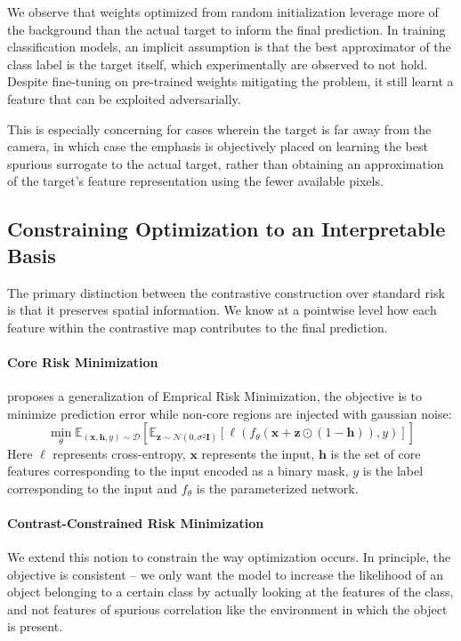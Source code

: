 \documentclass{article}
\theoremstyle{plain}
\theoremstyle{definition}
\theoremstyle{remark}
\begin{document}
We observe that weights optimized from random initialization leverage more of the background than the actual target to inform the final prediction. In training classification models, an implicit assumption is that the best approximator of the class label is the target itself, which experimentally are observed to not hold. Despite fine-tuning on pre-trained weights mitigating the problem, it still learnt a feature that can be exploited adversarially.

This is especially concerning for cases wherein the target is far away from the camera, in which case the emphasis is objectively placed on learning the best spurious surrogate to the actual target, rather than obtaining an approximation of the target's feature representation using the fewer available pixels.


\subsection{Constraining Optimization to an Interpretable Basis}
\label{sec:constraining-optimization}

The primary distinction between the contrastive construction over standard risk is that it preserves spatial information. We know at a pointwise level how each feature within the contrastive map contributes to the final prediction.

\paragraph{Core Risk Minimization \citep{singla2022core}} proposes a generalization of Emprical Risk Minimization, the objective is to minimize prediction error while non-core regions are injected with gaussian noise:
\begin{equation}\label{crm}
	\min_\theta \mathbb{E}_{(\bm{x}, \bm{h}, y) \sim \mathcal{D}} [ \mathbb{E}_{\bm{z} \sim \mathcal{N}(0, \sigma^2 \bm{I})} [ \ell(f_\theta(\bm{x} + \bm{z} \odot (1 - \bm{h})), y) ]]
\end{equation}
Here $\ell$ represents cross-entropy, $\bm{x}$ represents the input, $\bm{h}$ is the set of core features corresponding to the input encoded as a binary mask, $y$ is the label corresponding to the input and $f_\theta$ is the parameterized network.

\paragraph{Contrast-Constrained Risk Minimization} We extend this notion to constrain the way optimization occurs. In principle, the objective is consistent -- we only want the model to increase the likelihood of an object belonging to a certain class by actually looking at the features of the class, and not features of spurious correlation like the environment in which the object is present.
\end{document}
